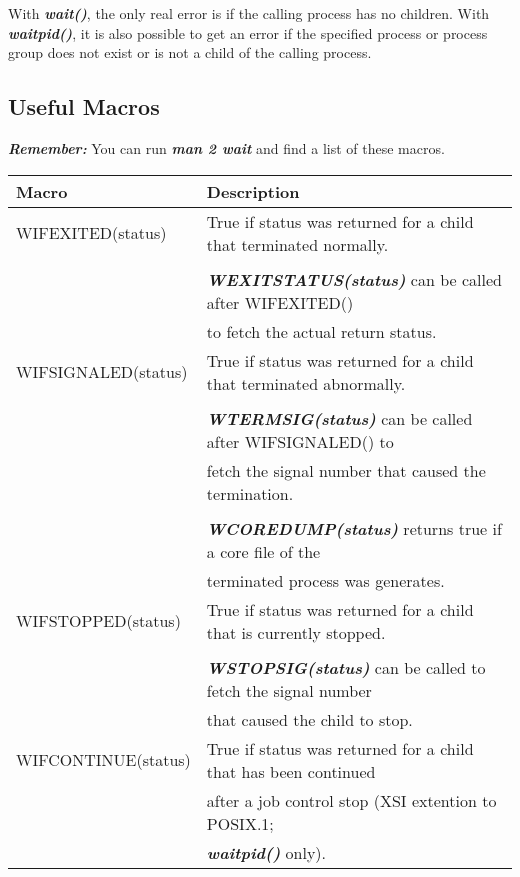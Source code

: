\documentclass{article}
\newcommand\be[1]{\textbf{\emph{#1}}}
\begin{document}
With \be{wait()}, the only real error is if the calling process has no children.
With \be{waitpid()}, it is also possible to get an error if the specified process or 
process group does not exist or is not a child of the calling process.\newline

\subsection{Useful Macros}
\be{Remember:} You can run \be{man 2 wait} and find a list of these macros.
\begin{center}
\begin{tabular}{|l | l|}
    \hline
    \textbf{Macro} & \textbf{Description} \\ %
    \hline
    WIFEXITED(status)   & True if status was returned for a 
                        child that terminated normally. \\
                        & \\
                        & \be{WEXITSTATUS(status)} can be called after WIFEXITED() \\
                        & to fetch the actual return status. \\ 
    \hline
    WIFSIGNALED(status) & True if status was returned for a 
                        child that terminated abnormally. \\
                        & \\
                        & \be{WTERMSIG(status)} can be called after
                        WIFSIGNALED() to \\ 
                        & fetch the signal number that caused the termination. \\
                        & \\
                        & \be{WCOREDUMP(status)} returns true if a core file of the \\
                        & terminated process was generates. \\

    \hline
    WIFSTOPPED(status)  & True if status was returned for a 
                        child that is currently stopped.\\
                        &\\
                        &\be{WSTOPSIG(status)} can be called to fetch the signal number \\ 
                        & that caused the child to stop. \\
    \hline
    WIFCONTINUE(status) & True if status was returned for a child that has been continued \\
                        & after a job control stop (XSI extention to POSIX.1; \\
                        & \be{waitpid()} only). \\
    \hline
\end{tabular}
\end{center}
\end{document}

